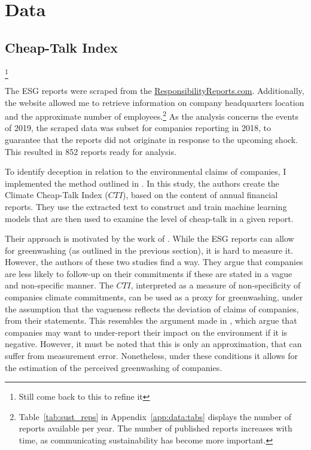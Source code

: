 \documentclass[12pt]{article}
\begin{document}
\section{Data}\label{sect:data}

\subsection{Cheap-Talk Index}\footnote{Still come back to this to refine it}

The ESG reports were scraped from the \href{https://responsibilityreports.com}{ResponsibilityReports.com}. Additionally, the website allowed me to retrieve information on company headquarters location and the approximate number of employees.\footnote{Table~\ref{tab:sust_reps} in Appendix~\ref{app:data:tabs} displays the number of reports available per year. The number of published reports increases with time, as communicating sustainability has become more important.} As the analysis concerns the events of 2019, the scraped data was subset for companies reporting in 2018, to guarantee that the reports did not originate in response to the upcoming shock. This resulted in 852 reports ready for analysis. 

To identify deception in relation to the environmental claims of companies, I implemented the method outlined in \textcite{binglerHowCheapTalk2024}. In this study, the authors create the Climate Cheap-Talk Index ($CTI$), based on the content of annual financial reports. They use the extracted text to construct and train machine learning models that are then used to examine the level of cheap-talk in a given report. 

Their approach is motivated by the work of \textcite{coenAreCorporateClimate2022, ramusWhenAreCorporate2005}. While the ESG reports can allow for greenwashing (as outlined in the previous section), it is hard to measure it. However, the authors of these two studies find a way. They argue that companies are less likely to follow-up on their commitments if these are stated in a vague and non-specific manner. The $CTI$, interpreted as a measure of non-specificity of companies climate commitments, can be used as a proxy for greenwashing, under the assumption that the vagueness reflects the deviation of claims of companies, from their statements. This resembles the argument made in \textcite{binglerCheapTalkCherrypicking2022,marquisScrutinyNormsSelective2016}, which argue that companies may want to under-report their impact on the environment if it is negative. However, it must be noted that this is only an approximation, that can suffer from measurement error. Nonetheless, under these conditions it allows for the estimation of the perceived greenwashing of companies. 
\end{document}
